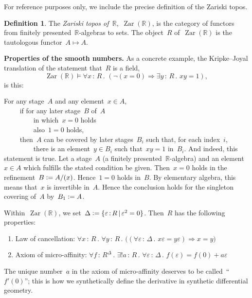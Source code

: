 \documentclass[oneside,reqno]{amsart}
\theoremstyle{definition}
\newtheorem{defn}{Definition}[section]
\theoremstyle{plain}
\theoremstyle{remark}
\newenvironment{indentblock}{%
  \list{}{\leftmargin\leftmargin}%
  \item\relax
}{%
  \endlist
}
\newcommand{\RR}{\mathbb{R}}
\newcommand{\defeq}{\vcentcolon=}
\DeclareMathOperator{\Zar}{Zar}
\renewcommand{\_}{\mathpunct{.}\,}
\newcommand{\?}{\,{:}\,}
\renewcommand{\paragraph}[1]{\noindent\textbf{#1.}}
\begin{document}
For reference purposes only, we include the precise definition of the Zariski topos.
\begin{defn}The \emph{Zariski topos of~$\RR$},~$\Zar(\RR)$, is the category of
functors from finitely presented~$\RR$-algebras to sets. The object~$R$
of~$\Zar(\RR)$ is the tautologous functor~$A \mapsto A$.
\end{defn}

\paragraph{Properties of the smooth numbers}
As a concrete example, the Kripke--Joyal translation of the statement that~$R$ is a field,
\[ \Zar(\RR) \models \forall x\?R\_ (\neg(x = 0) \Rightarrow \exists y\?R\_ xy = 1), \]
is this:
\begin{indentblock}
For any stage~$A$ and any element~$x \in A$, \\
${\qquad}$ if for any later stage~$B$ of~$A$ \\
${\qquad\qquad}$ in which~$x = 0$ holds \\
${\qquad\qquad}$ also~$1 = 0$ holds, \\
${\qquad}$ then~$A$ can be covered by later stages~$B_i$ such that, for each
index~$i$, \\
${\qquad\qquad}$ there is an element~$y \in B_i$ such that~$xy = 1$ in~$B_i$.
\end{indentblock}
And indeed, this statement is true. Let a stage~$A$ (a finitely
presented~$\RR$-algebra) and an element~$x \in A$ which fulfills the stated
condition be given. Then~$x = 0$ holds in the refinement~$B \defeq A/(x)$.
Hence~$1 = 0$ holds in~$B$. By elementary algebra, this means that~$x$ is
invertible in~$A$. Hence the conclusion holds for the singleton covering
of~$A$ by~$B_1 \defeq A$.

Within~$\Zar(\RR)$, we set~$\Delta \defeq \{ \varepsilon \? R \,|\,
\varepsilon^2 = 0 \}$. Then~$R$ has the following properties:
\begin{enumerate}
\item Law of cancellation: $\forall x \? R\_ \forall y \? R\_ \bigl((\forall
\varepsilon \? \Delta\_ x\varepsilon = y\varepsilon)
\Rightarrow x = y\bigr)$
\item Axiom of micro-affinity: $\forall f \? R^\Delta\_ \exists! a \? R\_
\forall \varepsilon \? \Delta\_ f(\varepsilon) = f(0) + a\varepsilon$
\end{enumerate}
The unique number~$a$ in the axiom of micro-affinity deserves to be
called~``$f'(0)$''; this is how we synthetically define the derivative in
synthetic differential geometry.
\end{document}
